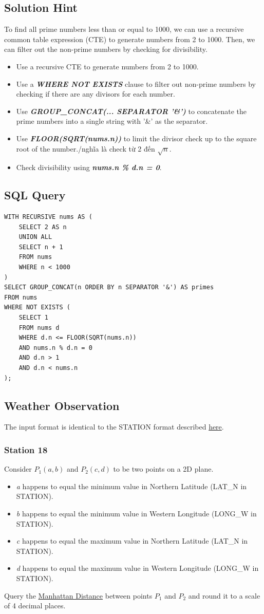 \documentclass[12pt,a4paper]{article}
\begin{document}
\subsection*{Solution Hint}
To find all prime numbers less than or equal to 1000, we can use a recursive common table expression (CTE) to generate numbers from 2 to 1000. 
Then, we can filter out the non-prime numbers by checking for divisibility.
\begin{itemize}
    \item Use a recursive CTE to generate numbers from 2 to 1000.
    \item Use a \textit{\textbf{WHERE NOT EXISTS}} clause to filter out non-prime numbers by checking if there are any divisors for each number.
    \item Use \textit{\textbf{GROUP\_CONCAT(... SEPARATOR '\&')}} to concatenate the prime numbers into a single string with '\&' as the separator.
    \item Use \textit{\textbf{FLOOR(SQRT(nums.n))}} to limit the divisor check up to the square root of the number./nghĩa là check từ 2 đến $\sqrt{n}$.
    \item Check divisibility using \textit{\textbf{nums.n \% d.n = 0}}.
\end{itemize}
\subsection*{SQL Query}
\begin{lstlisting}[style=sqlstyle]
WITH RECURSIVE nums AS (
    SELECT 2 AS n
    UNION ALL
    SELECT n + 1
    FROM nums
    WHERE n < 1000
)
SELECT GROUP_CONCAT(n ORDER BY n SEPARATOR '&') AS primes
FROM nums
WHERE NOT EXISTS (
    SELECT 1
    FROM nums d
    WHERE d.n <= FLOOR(SQRT(nums.n))
    AND nums.n % d.n = 0
    AND d.n > 1
    AND d.n < nums.n
);
\end{lstlisting}
\subsection{Weather Observation}
The input format is identical to the STATION format described
\hyperref[subsec:station-format]{here}.
\subsubsection{Station 18}
Consider $P_1(a,b)$ and $P_2(c,d)$ to be two points on a 2D plane.
\begin{itemize}
    \item \textit{a} happens to equal the minimum value in Northern Latitude (LAT\_N in STATION).
    \item \textit{b} happens to equal the minimum value in Western Longitude (LONG\_W in STATION).
    \item \textit{c} happens to equal the maximum value in Northern Latitude (LAT\_N in STATION).
    \item \textit{d} happens to equal the maximum value in Western Longitude (LONG\_W in STATION).
\end{itemize}
Query the \href{https://xlinux.nist.gov/dads/HTML/manhattanDistance.html}{Manhattan Distance} between points $P_1$ and $P_2$ and round it to a scale of 4 decimal places.
\end{document}
